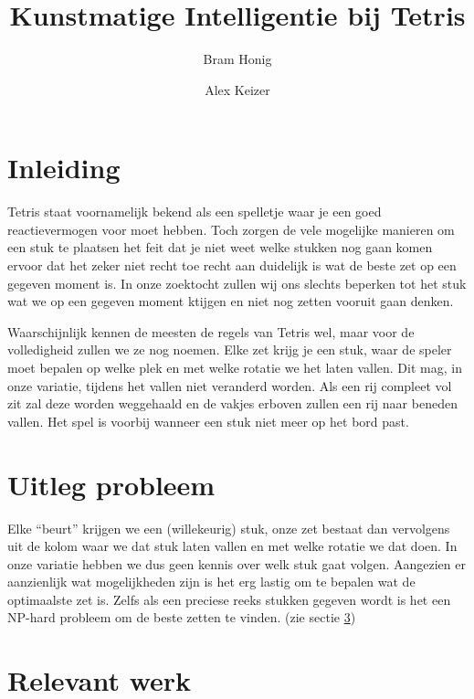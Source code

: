 \documentclass[10pt]{article}
\author{Bram Honig \and Alex Keizer}
\title{Kunstmatige Intelligentie bij Tetris}
\begin{document}

\maketitle

\section{Inleiding} 
Tetris staat voornamelijk bekend als een spelletje waar je een goed reactievermogen voor moet hebben. Toch zorgen de vele mogelijke manieren om een stuk te plaatsen het feit dat je niet weet welke stukken nog gaan komen ervoor dat het zeker niet recht toe recht aan duidelijk is wat de beste zet op een gegeven moment is. In onze zoektocht zullen wij ons slechts beperken tot het stuk wat we op een gegeven moment ktijgen en niet nog zetten vooruit gaan denken.

Waarschijnlijk kennen de meesten de regels van Tetris wel, maar voor de volledigheid zullen we ze nog noemen. Elke zet krijg je een stuk, waar de speler moet bepalen op welke plek en met welke rotatie we het laten vallen. Dit mag, in onze variatie, tijdens het vallen niet veranderd worden. Als een rij compleet vol zit zal deze worden weggehaald en de vakjes erboven zullen een rij naar beneden vallen. Het spel is voorbij wanneer een stuk niet meer op het bord past.

\section{Uitleg probleem}\label{probleem}

Elke ``beurt'' krijgen we een (willekeurig) stuk, onze zet bestaat dan vervolgens uit de kolom waar we dat stuk laten vallen en met welke rotatie we dat doen. In onze variatie hebben we dus geen kennis over welk stuk gaat volgen. Aangezien er aanzienlijk wat mogelijkheden zijn is het erg lastig om te bepalen wat de optimaalste zet is. Zelfs als een preciese reeks stukken gegeven wordt is het een NP-hard probleem om de beste zetten te vinden. \cite{nphard} (zie sectie \ref{relevant})

\section{Relevant werk}\label{relevant}
\end{document}
